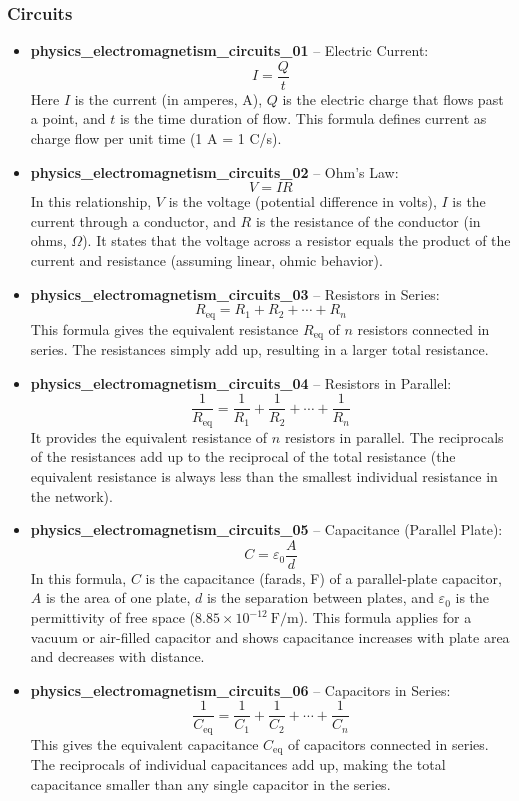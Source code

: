 \documentclass[11pt,a4paper]{article}
\begin{document}
\subsubsection{Circuits}

\begin{itemize}
\item \textbf{physics\_electromagnetism\_circuits\_01} -- Electric Current: 
\[I = \frac{Q}{t}\]
Here $I$ is the current (in amperes, A), $Q$ is the electric charge that flows past a point, and $t$ is the time duration of flow. This formula defines current as charge flow per unit time (1 A = 1 C/s).

\item \textbf{physics\_electromagnetism\_circuits\_02} -- Ohm's Law: 
\[V = IR\]
In this relationship, $V$ is the voltage (potential difference in volts), $I$ is the current through a conductor, and $R$ is the resistance of the conductor (in ohms, $\Omega$). It states that the voltage across a resistor equals the product of the current and resistance (assuming linear, ohmic behavior).

\item \textbf{physics\_electromagnetism\_circuits\_03} -- Resistors in Series: 
\[R_{\text{eq}} = R_1 + R_2 + \cdots + R_n\]
This formula gives the equivalent resistance $R_{\text{eq}}$ of $n$ resistors connected in series. The resistances simply add up, resulting in a larger total resistance.

\item \textbf{physics\_electromagnetism\_circuits\_04} -- Resistors in Parallel: 
\[\frac{1}{R_{\text{eq}}} = \frac{1}{R_1} + \frac{1}{R_2} + \cdots + \frac{1}{R_n}\]
It provides the equivalent resistance of $n$ resistors in parallel. The reciprocals of the resistances add up to the reciprocal of the total resistance (the equivalent resistance is always less than the smallest individual resistance in the network).

\item \textbf{physics\_electromagnetism\_circuits\_05} -- Capacitance (Parallel Plate): 
\[C = \varepsilon_0\frac{A}{d}\]
In this formula, $C$ is the capacitance (farads, F) of a parallel-plate capacitor, $A$ is the area of one plate, $d$ is the separation between plates, and $\varepsilon_0$ is the permittivity of free space ($8.85\times10^{-12}\ \text{F/m}$). This formula applies for a vacuum or air-filled capacitor and shows capacitance increases with plate area and decreases with distance.

\item \textbf{physics\_electromagnetism\_circuits\_06} -- Capacitors in Series: 
\[\frac{1}{C_{\text{eq}}} = \frac{1}{C_1} + \frac{1}{C_2} + \cdots + \frac{1}{C_n}\]
This gives the equivalent capacitance $C_{\text{eq}}$ of capacitors connected in series. The reciprocals of individual capacitances add up, making the total capacitance smaller than any single capacitor in the series.


\end{itemize}
\end{document}

